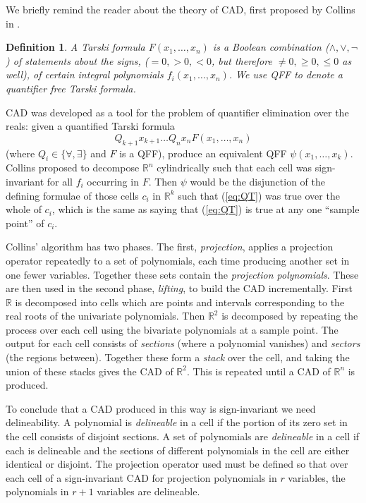 \documentclass{article}
\def\R {\ensuremath{\mathbb{R}}}
\newtheorem{definition}{Definition}
\begin{document}
We briefly remind the reader about the theory of CAD, first proposed by Collins in \cite{Collins1975}.
\begin{definition}
A {\em Tarski formula\/} $F(x_1,\ldots,x_n)$ is a Bool\-ean combination ($\land,\lor,\neg$) of statements about the signs, ($=0,>0,<0$, but therefore $\ne0,\ge0,\le0$ as well), of certain integral polynomials $f_i(x_1,\ldots,x_n)$.  We use {\em QFF} to denote a quantifier free Tarski formula.
\end{definition}
CAD was developed as a tool for the problem of quantifier elimination over the reals: given a quantified Tarski formula
\begin{equation}\label{eq:QT}
Q_{k+1}x_{k+1}\ldots Q_nx_n F(x_1,\ldots,x_n)
\end{equation}
(where $Q_i\in\{\forall,\exists\}$ and $F$ is a QFF), produce an equivalent QFF $\psi(x_1,\ldots,x_k)$. Collins proposed to decompose $\R^n$ cylindrically such that each cell was sign-invariant for all $f_i$ occurring in $F$. Then $\psi$ would be the disjunction of the defining formulae of those cells $c_i$ in $\R^k$ such that (\ref{eq:QT}) was true over the whole of $c_i$, which is the same as saying that (\ref{eq:QT}) is true at any one ``sample point'' of $c_i$.
\par
Collins' algorithm has two phases.  The first, \textit{projection}, applies a projection operator repeatedly to a set of polynomials, each time producing another set in one fewer variables.  Together these sets contain the {\em projection polynomials}.
These are then used in the second phase, \textit{lifting}, to build the CAD incrementally.  First $\R$ is decomposed into cells which are points and intervals corresponding to the real roots of the univariate polynomials.  Then $\R^2$ is decomposed by repeating the process over each cell using the bivariate polynomials at a sample point.  The output for each cell consists of {\em sections} (where a polynomial vanishes) and {\em sectors} (the regions between). Together these form a {\em stack} over the cell, and taking the union of these stacks gives the CAD of $\R^2$.  This is repeated until a CAD of $\R^n$ is produced.  
\par
To conclude that a CAD produced in this way is sign-invariant we need delineability.  A polynomial is {\em delineable} in a cell if the portion of its zero set in the cell consists of disjoint sections.  A set of polynomials are {\em delineable} in a cell if each is delineable and the sections of different polynomials in the cell are either identical or disjoint.  The projection operator used must be defined so that over each cell of a sign-invariant CAD for projection polynomials in $r$ variables, the polynomials in $r+1$ variables are delineable.
\end{document}
